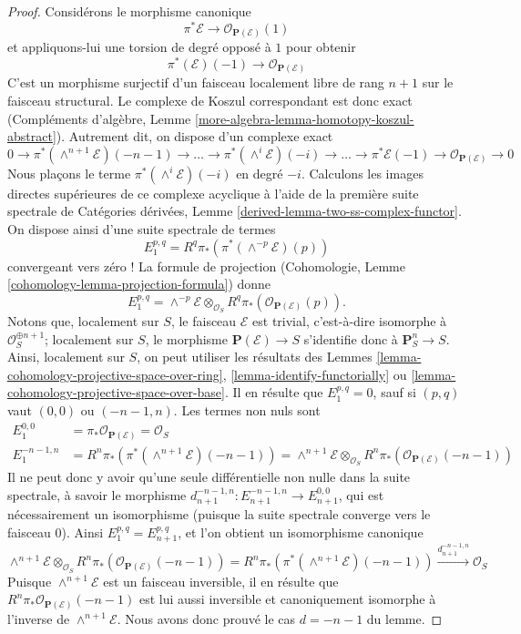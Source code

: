 \begin{proof}
Considérons le morphisme canonique
$$
\pi^*\mathcal{E} \longrightarrow \mathcal{O}_{\mathbf{P}(\mathcal{E})}(1)
$$
et appliquons-lui une torsion de degré opposé à $1$ pour obtenir
$$
\pi^*(\mathcal{E})(-1) \longrightarrow \mathcal{O}_{\mathbf{P}(\mathcal{E})}
$$
C'est un morphisme surjectif d'un faisceau localement libre de rang $n + 1$ sur
le faisceau structural. Le complexe de Koszul correspondant est donc
exact (Compléments d'algèbre, Lemme
\ref{more-algebra-lemma-homotopy-koszul-abstract}).
Autrement dit, on dispose d'un complexe exact
$$
0 \to
\pi^*(\wedge^{n + 1}\mathcal{E})(-n - 1) \to
\ldots \to
\pi^*(\wedge^i\mathcal{E})(-i) \to
\ldots \to
\pi^*\mathcal{E}(-1) \to
\mathcal{O}_{\mathbf{P}(\mathcal{E})} \to 0
$$
Nous plaçons le terme $\pi^*(\wedge^i\mathcal{E})(-i)$
en degré $-i$.
Calculons les images directes supérieures
de ce complexe acyclique à l'aide de la première suite spectrale de
Catégories dérivées, Lemme \ref{derived-lemma-two-ss-complex-functor}.
On dispose ainsi d'une suite spectrale de termes
$$
E_1^{p, q} = R^q\pi_*\left(\pi^*(\wedge^{-p}\mathcal{E})(p)\right)
$$
convergeant vers zéro ! La formule de projection
(Cohomologie, Lemme \ref{cohomology-lemma-projection-formula})
donne
$$
E_1^{p, q} = \wedge^{-p} \mathcal{E} \otimes_{\mathcal{O}_S}
R^q\pi_*\left(\mathcal{O}_{\mathbf{P}(\mathcal{E})}(p)\right).
$$
Notons que, localement sur $S$, le faisceau $\mathcal{E}$ est trivial,
c'est-à-dire isomorphe à $\mathcal{O}_S^{\oplus n + 1}$; localement sur
$S$, le morphisme $\mathbf{P}(\mathcal{E}) \to S$ s'identifie donc
à $\mathbf{P}^n_S \to S$. Ainsi,
localement sur $S$, on peut utiliser les résultats des Lemmes
\ref{lemma-cohomology-projective-space-over-ring},
\ref{lemma-identify-functorially} ou
\ref{lemma-cohomology-projective-space-over-base}.
Il en résulte que $E_1^{p, q} = 0$, sauf si $(p, q)$ vaut $(0, 0)$
ou $(-n - 1, n)$. Les termes non nuls sont
\begin{align*}
E_1^{0, 0} & = \pi_*\mathcal{O}_{\mathbf{P}(\mathcal{E})} = \mathcal{O}_S \\
E_1^{-n - 1, n} & =
R^n\pi_*\left(\pi^*(\wedge^{n + 1}\mathcal{E})(-n - 1)\right) =
\wedge^{n + 1}\mathcal{E} \otimes_{\mathcal{O}_S}
R^n\pi_*\left(\mathcal{O}_{\mathbf{P}(\mathcal{E})}(-n - 1)\right)
\end{align*}
Il ne peut donc y avoir qu'une seule différentielle non nulle
dans la suite spectrale, à savoir le morphisme
$d_{n + 1}^{-n - 1, n} : E_{n + 1}^{-n - 1, n} \to E_{n + 1}^{0, 0}$,
qui est nécessairement un isomorphisme (puisque la suite spectrale converge
vers le faisceau $0$). Ainsi $E_1^{p, q} = E_{n + 1}^{p, q}$, et
l'on obtient un isomorphisme canonique
$$
\wedge^{n + 1}\mathcal{E} \otimes_{\mathcal{O}_S}
R^n\pi_*\left(\mathcal{O}_{\mathbf{P}(\mathcal{E})}(-n - 1)\right) =
R^n\pi_*\left(\pi^*(\wedge^{n + 1}\mathcal{E})(-n - 1)\right)
\xrightarrow{d_{n + 1}^{-n - 1, n}}
\mathcal{O}_S
$$
Puisque $\wedge^{n + 1}\mathcal{E}$ est un faisceau inversible,
il en résulte que
$R^n\pi_*\mathcal{O}_{\mathbf{P}(\mathcal{E})}(-n - 1)$ est lui aussi inversible
et canoniquement isomorphe à l'inverse de
$\wedge^{n + 1}\mathcal{E}$. Nous avons donc prouvé le cas
$d = - n - 1$ du lemme.


\end{proof}
